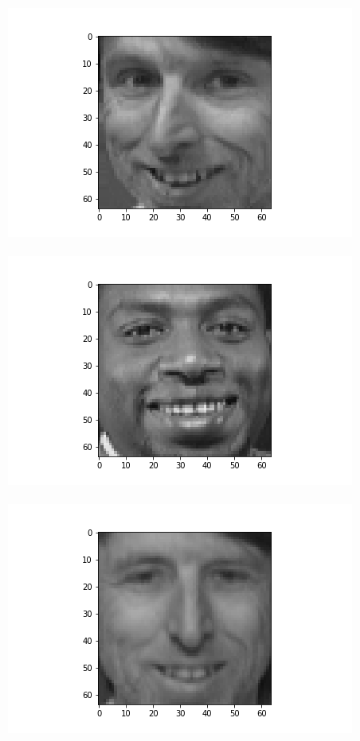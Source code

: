 \documentclass[12pt, a4paper]{article}
\begin{document}
\begin{figure}[h]
\begin{subfigure}{0.3\linewidth}
    \end{subfigure}
    \newline
    \begin{subfigure}{0.3\linewidth}
        \centering
        \includegraphics[width=\linewidth]{images/q3/c/6/6.png}
    \end{subfigure}
    \hfill
    \begin{subfigure}{0.3\linewidth}
        \centering
        \includegraphics[width=\linewidth]{images/q3/c/6/7.png}
    \end{subfigure}
    \hfill
    \begin{subfigure}{0.3\linewidth}
        \centering
        \includegraphics[width=\linewidth]{images/q3/c/6/8.png}

\end{subfigure}
\end{figure}
\end{document}
